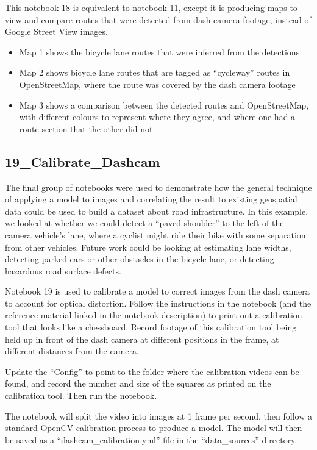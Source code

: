 \documentclass[11pt,twoside]{report}
\begin{document}
This notebook 18 is equivalent to notebook 11, except it is producing maps to view and compare routes that were detected from dash camera footage, instead of Google Street View images.

\begin{itemize}
\item{Map 1 shows the bicycle lane routes that were inferred from the detections}
\item{Map 2 shows bicycle lane routes that are tagged as ``cycleway'' routes in OpenStreetMap, where the route was covered by the dash camera footage}
\item{Map 3 shows a comparison between the detected routes and OpenStreetMap, with different colours to represent where they agree, and where one had a route section that the other did not.}	
\end{itemize}


\subsection{19\_Calibrate\_Dashcam}
\label{a19}

The final group of notebooks were used to demonstrate how the general technique of applying a model to images and correlating the result to existing geospatial data could be used to build a dataset about road infrastructure.  In this example, we looked at whether we could detect a ``paved shoulder'' to the left of the camera vehicle's lane, where a cyclist might ride their bike with some separation from other vehicles.  Future work could be looking at estimating lane widths, detecting parked cars or other obstacles in the bicycle lane, or detecting hazardous road surface defects.

Notebook 19 is used to calibrate a model to correct images from the dash camera to account for optical distortion.  Follow the instructions in the notebook (and the reference material linked in the notebook description) to print out a calibration tool that looks like a chessboard.  Record footage of this calibration tool being held up in front of the dash camera at different positions in the frame, at different distances from the camera.

Update the ``Config'' to point to the folder where the calibration videos can be found, and record the number and size of the squares as printed on the calibration tool.  Then run the notebook.

The notebook will split the video into images at 1 frame per second, then follow a standard OpenCV calibration process to produce a model.  The model will then be saved as a ``dashcam\_calibration.yml'' file in the ``data\_sources'' directory.
\end{document}
